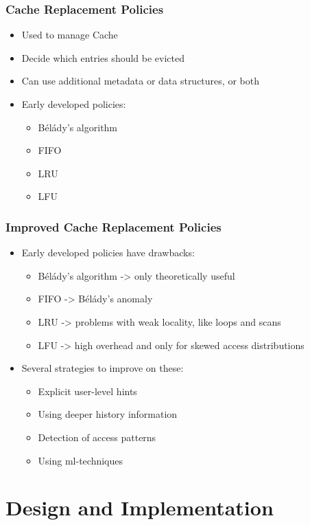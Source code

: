 \documentclass[
	aspectratio=169,
	compress,
]{beamer}
\newcommand{\navframetitle}[1]{\frametitle{#1\hfill{\footnotesize\lastsection{}}}}
\begin{document}
\begin{frame}
	\navframetitle{Cache Replacement Policies}

	\begin{itemize}
		\item Used to manage Cache
		\item Decide which entries should be evicted
		\item Can use additional metadata or data structures, or both
		\item Early developed policies:
		\begin{itemize}
			\item Bélády’s algorithm
			\item FIFO
			\item LRU
			\item LFU
		\end{itemize}
	\end{itemize}
\end{frame}

\begin{frame}
	\navframetitle{Improved Cache Replacement Policies}

	\begin{itemize}
	\item Early developed policies have drawbacks:
	\begin{itemize}
		\item Bélády’s algorithm -> only theoretically useful
		\item FIFO -> Bélády’s anomaly
		\item LRU -> problems with weak locality, like loops and scans
		\item LFU -> high overhead and only for skewed access distributions
	\end{itemize}
	\item Several strategies to improve on these:
	\begin{itemize}
		\item Explicit user-level hints
    	\item Using deeper history information
    	\item Detection of access patterns
    	\item Using ml-techniques
	\end{itemize}
	\end{itemize}
\end{frame}

\section{Design and Implementation}
\label{sec:design}
\end{document}
